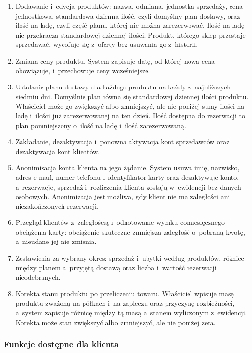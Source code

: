 \documentclass[12pt,a4paper,oneside]{article}
\begin{document}
\begin{enumerate}[resume*=wf]
	\item \label{wf:produkty} Dodawanie i~edycja produktów: nazwa, odmiana, jednostka sprzedaży, cena jednostkowa, standardowa dzienna ilość, czyli domyślny plan dostawy, oraz ilość na ladę, czyli część planu, której nie można zarezerwować. Ilość na ladę nie przekracza standardowej dziennej ilości. Produkt, którego sklep przestaje sprzedawać, wycofuje się z~oferty bez usuwania go z~historii.
	\item \label{wf:cena} Zmiana ceny produktu. System zapisuje datę, od której nowa cena obowiązuje, i~przechowuje ceny wcześniejsze.
	\item \label{wf:plan-dostawy} Ustalanie planu dostawy dla każdego produktu na każdy z~najbliższych siedmiu dni. Domyślnie plan równa się standardowej dziennej ilości produktu. Właściciel może go zwiększyć albo zmniejszyć, ale nie poniżej sumy ilości na ladę i~ilości już zarezerwowanej na ten dzień. Ilość dostępna do rezerwacji to plan pomniejszony o~ilość na ladę i~ilość zarezerwowaną.
	\item \label{wf:konta-personelu} Zakładanie, dezaktywacja i~ponowna aktywacja kont sprzedawców oraz dezaktywacja kont klientów.
	\item \label{wf:anonimizacja} Anonimizacja konta klienta na jego żądanie. System usuwa imię, nazwisko, adres e-mail, numer telefonu i~identyfikator karty oraz dezaktywuje konto, a~rezerwacje, sprzedaż i~rozliczenia klienta zostają w~ewidencji bez danych osobowych. Anonimizacja jest możliwa, gdy klient nie ma zaległości ani niezakończonych rezerwacji.
	\item \label{wf:obciazenie} Przegląd klientów z~zaległością i~odnotowanie wyniku comiesięcznego obciążenia karty: obciążenie skuteczne zmniejsza zaległość o~pobraną kwotę, a~nieudane jej nie zmienia.
	\item \label{wf:zestawienia} Zestawienia za wybrany okres: sprzedaż i~ubytki według produktów, różnice między planem a~przyjętą dostawą oraz liczba i~wartość rezerwacji nieodebranych.
	\item \label{wf:korekta} Korekta stanu produktu po przeliczeniu towaru. Właściciel wpisuje masę produktu zważoną na półkach i~na zapleczu oraz przyczynę rozbieżności, a~system zapisuje różnicę między tą masą a~stanem wyliczonym z~ewidencji. Korekta może stan zwiększyć albo zmniejszyć, ale nie poniżej zera.
\end{enumerate}

\subsubsection{Funkcje dostępne dla klienta}
\end{document}
